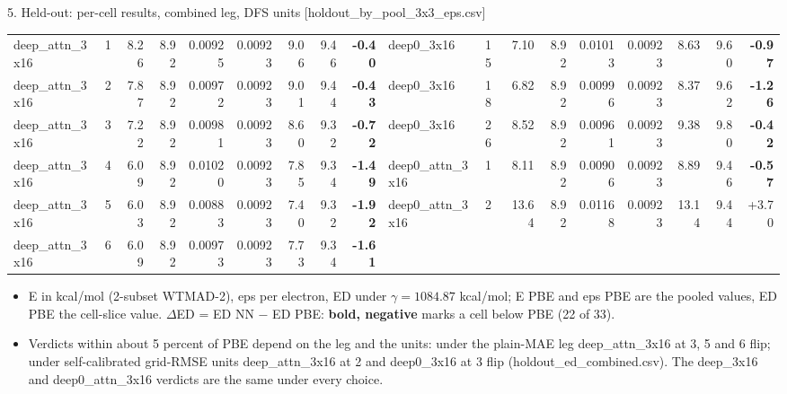\begin{frame}{5. Held-out: per-cell results, combined leg, DFS units [holdout\_by\_pool\_3x3\_eps.csv]}
\begin{center}
\begin{tabular}{llrrrrrrr|llrrrrrrr}
  deep\_attn\_3x16 & 1 & 8.26 & 8.92 & 0.00925 & 0.00923 & 9.06 & 9.46 & \textbf{-0.40} & deep0\_3x16 & 15 & 7.10 & 8.92 & 0.01013 & 0.00923 & 8.63 & 9.60 & \textbf{-0.97} \\
  deep\_attn\_3x16 & 2 & 7.87 & 8.92 & 0.00972 & 0.00923 & 9.01 & 9.44 & \textbf{-0.43} & deep0\_3x16 & 18 & 6.82 & 8.92 & 0.00996 & 0.00923 & 8.37 & 9.62 & \textbf{-1.26} \\
  deep\_attn\_3x16 & 3 & 7.22 & 8.92 & 0.00981 & 0.00923 & 8.60 & 9.32 & \textbf{-0.72} & deep0\_3x16 & 26 & 8.52 & 8.92 & 0.00961 & 0.00923 & 9.38 & 9.80 & \textbf{-0.42} \\
  deep\_attn\_3x16 & 4 & 6.09 & 8.92 & 0.01020 & 0.00923 & 7.85 & 9.34 & \textbf{-1.49} & deep0\_attn\_3x16 & 1 & 8.11 & 8.92 & 0.00906 & 0.00923 & 8.89 & 9.46 & \textbf{-0.57} \\
  deep\_attn\_3x16 & 5 & 6.03 & 8.92 & 0.00883 & 0.00923 & 7.40 & 9.32 & \textbf{-1.92} & deep0\_attn\_3x16 & 2 & 13.64 & 8.92 & 0.01168 & 0.00923 & 13.14 & 9.44 & +3.70 \\
  deep\_attn\_3x16 & 6 & 6.09 & 8.92 & 0.00973 & 0.00923 & 7.73 & 9.34 & \textbf{-1.61} & & & & & & & & & \\
  \bottomrule
  \end{tabular}
  \end{center}
  \scriptsize
  \begin{itemize}
    \item E in kcal/mol (2-subset WTMAD-2), eps per electron, ED under $\gamma = 1084.87$ kcal/mol; E PBE and eps PBE are the pooled values, ED PBE the cell-slice value. $\Delta$ED = ED NN $-$ ED PBE: \textbf{bold, negative} marks a cell below PBE (22 of 33).
    \item Verdicts within about 5 percent of PBE depend on the leg and the units: under the plain-MAE leg deep\_attn\_3x16 at 3, 5 and 6 flip; under self-calibrated grid-RMSE units deep\_attn\_3x16 at 2 and deep0\_3x16 at 3 flip (holdout\_ed\_combined.csv). The deep\_3x16 and deep0\_attn\_3x16 verdicts are the same under every choice.
  \end{itemize}
\end{frame}
